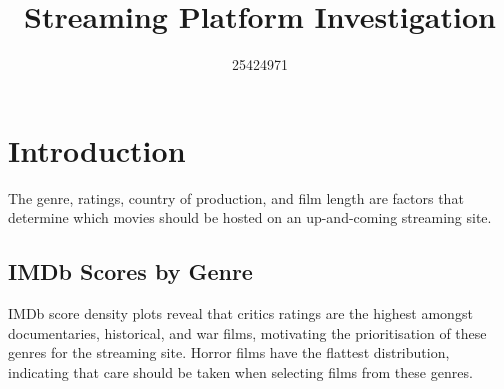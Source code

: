 \documentclass[11pt,preprint]{elsarticle}
\numberwithin{equation}{section}
\numberwithin{figure}{section}
\numberwithin{table}{section}
\begin{document}
\begin{frontmatter}  %

\title{Streaming Platform Investigation}





\author[Add1]{25424971}








\vspace{1cm}





\vspace{0.5cm}

\end{frontmatter}

\setcounter{footnote}{0}



\pagestyle{fancy}
\chead{}
\rhead{}
\lfoot{}
\lhead{}
\cfoot{}


\headsep 35pt %




\section{Introduction}\label{introduction}

The genre, ratings, country of production, and film length are factors
that determine which movies should be hosted on an up-and-coming
streaming site.

\subsection{IMDb Scores by Genre}\label{imdb-scores-by-genre}

IMDb score density plots reveal that critics ratings are the highest
amongst documentaries, historical, and war films, motivating the
prioritisation of these genres for the streaming site. Horror films have
the flattest distribution, indicating that care should be taken when
selecting films from these genres.
\end{document}
